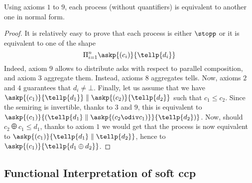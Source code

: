 \documentclass[festschrift13.tex]{subfiles}
\begin{document}
\begin{proposition}
Using axioms $1$ to $9$, each process (without quantifiers) is equivalent to another one in normal form.
\end{proposition}
\begin{proof}
It is relatively easy to prove that each process is either $\stopp$ or it is equivalent to one of the shape 
\[ \Pi_{i=1}^n \askp{(c_i)}{\tellp{d_i}} \]
Indeed, axiom $9$ allows to distribute asks with respect to parallel composition, and axiom $3$ aggregate them.
Instead, axioms $8$ aggregates tells. Now, axioms $2$ and $4$ guarantees that $d_i \neq \bot$.
Finally, let us assume that we have $\askp{(c_1)}{\tellp{d_1}} \parallel \askp{(c_2)}{\tellp{d_2}}$ such that
$c_1 \leq c_2$. Since the semiring is invertible, thanks to $3$ and $9$, this is equivalent to $\askp{(c_1)}{(\tellp{d_1} \parallel \askp{(c_2\odiv c_1)}}{\tellp{d_2})}$. 
%
Now, should $c_2\odiv c_1 \leq d_1$, thanks to axiom $1$ we would get that the process is now equivalent to 
$\askp{(c_1)}{\tellp{d_1} \parallel \tellp{d_2}}$, hence to $\askp{(c_1)}{\tellp{d_1 \oplus d_2}}$.
\end{proof}

\subsection{Functional Interpretation of soft ccp}
\end{document}
